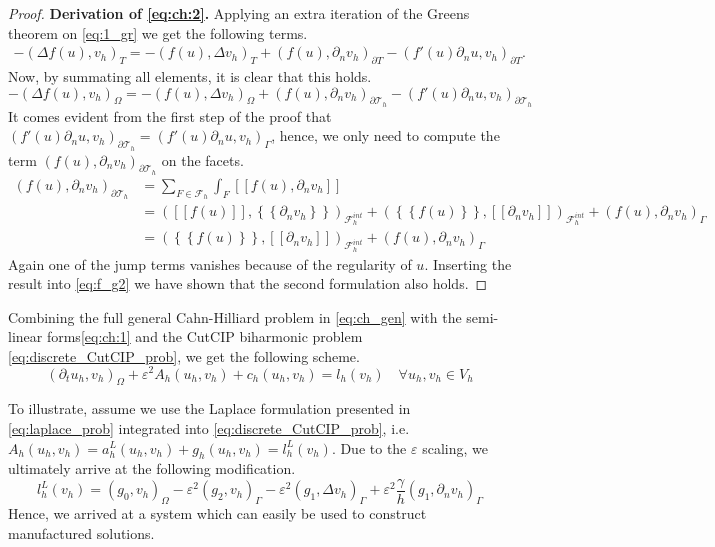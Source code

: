 \documentclass[11pt]{article}
\theoremstyle{remark}
\newcommand{\mean}[1]{\left\{\!\!\left\{#1\right\}\!\!\right\}}
\newcommand{\jump}[1]{\left[\!\left[ #1 \right]\!\right]}
\numberwithin{equation}{section}
\begin{document}
\begin{proof}
         \textbf{Derivation of \eqref{eq:ch:2}.  }  Applying an extra iteration of the Greens theorem on \eqref{eq:1_gr} we get the following terms.
\[
    \begin{split}
-(\Delta f( u) , v_{h})_{T }  = -( f( u), \Delta v_{h} )_{T} + (f( u), \partial _{n} v_{h}  )_{\partial T} - (   f'( u)\partial _{n}u, v_{h} )_{\partial T } .
    \end{split}
\]
Now, by summating all elements, it is clear that this holds.
\begin{equation}
\label{eq:f_g2}
-(\Delta f( u) , v_{h})_{\Omega  }  = -( f( u), \Delta v_{h} )_{\Omega } + (f( u), \partial _{n} v_{h}  )_{\partial \mathcal{T}_{h} } - (   f'( u)\partial _{n}u, v_{h} )_{\partial \mathcal{T}_{h}  }
\end{equation}
It comes evident from the first step of the proof that $ (   f'( u)\partial _{n}u, v_{h} )_{\partial \mathcal{T}_{h}  } = (   f'( u)\partial _{n}u, v_{h} )_{\Gamma }$, hence, we only need to compute the term $(f( u), \partial _{n} v_{h}  )_{\partial
\mathcal{T}_{h} }$ on the facets. \[
    \begin{split}
(f( u), \partial _{n} v_{h}  )_{\partial
\mathcal{T}_{h} } & = \sum_{F\in \mathcal{F} _{h}}^{} \int_{F}^{}\jump{ f( u), \partial _{n} v_{h}  } \\
& =  (\jump{ f( u)  }  , \mean{ \partial _{n} v_{h} }    )_{ \mathcal{F}_{h}^{int} } +(\mean{ f( u)  }  , \jump{ \partial _{n} v_{h} }    )_{ \mathcal{F}_{h}^{int} } + (f( u), \partial _{n} v_{h}  )_{\Gamma } \\
&=  (\mean{ f( u)  }  , \jump{ \partial _{n} v_{h} }    )_{ \mathcal{F}_{h}^{int} } + (f( u), \partial _{n} v_{h}  )_{\Gamma }
    \end{split}
\]
Again one of the jump terms vanishes because of the regularity of $u$.
Inserting the result into \eqref{eq:f_g2} we have shown that the second formulation also holds.
\end{proof}


Combining the full general Cahn-Hilliard problem in \eqref{eq:ch_gen} with the semi-linear forms\eqref{eq:ch:1} and the CutCIP biharmonic problem \eqref{eq:discrete_CutCIP_prob}, we get the following scheme.
\begin{equation}
    ( \partial _{t}u_{h}, v_{h})_\Omega + \varepsilon^2  A_{h}( u_{h},v_{h}) + c_{h}( u_{h},v_{h})   =   l_{h}(v_{h}) \quad  \forall u_{h}, v_{h} \in V_{h}
\end{equation}

To illustrate, assume we use the Laplace formulation presented in \eqref{eq:laplace_prob} integrated into \eqref{eq:discrete_CutCIP_prob}, i.e. $A_{h}( u_{h}, v_{h}) = a^{L}_{h}( u_{h}, v_{h}) + g_{h}( u_{h}, v_{h})   = l_{h}^{L}( v_{h})$. Due to the $\varepsilon $ scaling, we ultimately
arrive at the following modification.
 \begin{equation}
    l_{h}^{L}( v_{h})  =  \left( g_{0}, v_{h} \right) _{\Omega } -  \varepsilon^2 ( g_{2},  v_{h} )_{\Gamma }  -  \varepsilon^2 ( g_{1}, \Delta  v_{h}  )_{\Gamma }  + \varepsilon^2 \frac{\gamma }{h} ( g_{1}, \partial _{n} v_{h}  )_{\Gamma }
 \end{equation}
 Hence, we arrived at a system which can easily be used to construct manufactured solutions.
\end{document}

